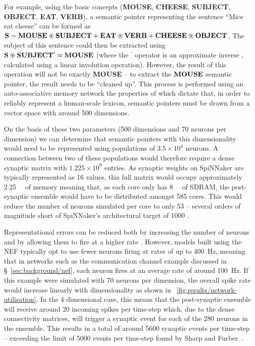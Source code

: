 \documentclass[conference]{IEEEtran}
\newcommand{\semanticpointer}{\textbf}
\newcommand{\msemanticpointer}[1]{\mbox{\semanticpointer{#1}}}
\begin{document}
For example, using the basic concepts (\semanticpointer{MOUSE}, \semanticpointer{CHEESE}, \semanticpointer{SUBJECT}, \semanticpointer{OBJECT}, \semanticpointer{EAT}, \semanticpointer{VERB}), a semantic pointer representing the sentence ``Mice eat cheese'' can be formed as $\msemanticpointer{S} = \msemanticpointer{MOUSE} \circledast \msemanticpointer{SUBJECT} + \msemanticpointer{EAT} \circledast \msemanticpointer{VERB} + \msemanticpointer{CHEESE} \circledast \msemanticpointer{OBJECT}$.
The subject of this sentence could then be extracted using $\msemanticpointer{S} \circledast \msemanticpointer{SUBJECT}^\prime \approx \msemanticpointer{MOUSE}$ (where the ${}^\prime$ operator is an approximate inverse \parencite[\S D.2]{eliasmith2013build}, calculated using a linear involution operation).
However, the result of this operation will not  be exactly \semanticpointer{MOUSE} -- to extract the $\msemanticpointer{MOUSE}$ semantic pointer, the result needs to be ``cleaned up''.
This process is performed using an auto-associative memory network \parencite{Stewart2011} the properties of which dictate that, in order to reliably represent a human-scale lexicon, semantic pointers must be drawn from a vector space with around 500 dimensions.

On the basis of these two parameters (500 dimensions and 70 neurons per dimension) we can determine that semantic pointers with this dimensionality would need to be represented using populations of $3.5\times10^4$ neurons.
A connection between two of these populations would therefore require a dense synaptic matrix with $1.225\times10^9$ entries.
As synaptic weights on SpiNNaker are typically represented as \SI{16}{\bit} values, this full matrix would occupy approximately \SI{2.25}{\gibi\byte} of memory meaning that, as each core only has \SI{8}{\mebi\byte} of SDRAM, the post-synaptic ensemble would have to be distributed amongst 585 cores.
This would reduce the number of neurons simulated per core to only 53 -- several orders of magnitude short of SpiNNaker's architectural target of 1000 \parencite{Furber2007}. 

Representational errors can be reduced both by increasing the number of neurons and by allowing them to fire at a higher rate \parencite{Eliasmith2004}.
However, models built using the NEF typically opt to use fewer neurons firing at rates of up to \SI{400}{\hertz}, meaning that in networks such as the communication channel example discussed in \S~\ref{sec:background/nef}, each neuron fires at an average rate of around \SI{100}{\hertz}.
If this example were simulated with 70 neurons per dimension, the overall spike rate would increase linearly with dimensionality as shown in \figurename~\ref{fig:results/network-utilisation}.
In the 4 dimensional case, this means that the post-synaptic ensemble will receive around 20 incoming spikes per time-step which, due to the dense connectivity matrices, will trigger a synaptic event for each of the 280 neurons in the ensemble. 
This results in a total of around 5600 synaptic events per time-step -- exceeding the limit of 5000 events per time-step found by Sharp and Furber~\parencite{Sharp2013}.
\end{document}
